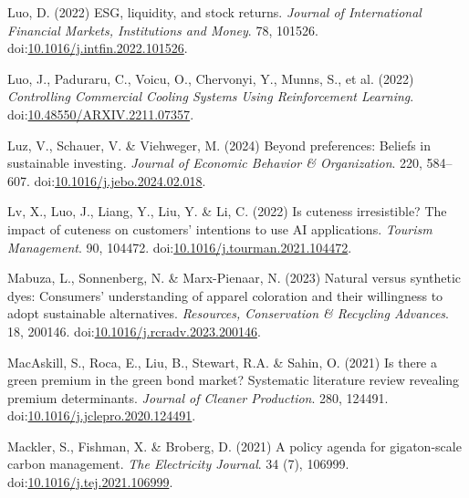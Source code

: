 \documentclass[
  letterpaper,
  DIV=11,
  numbers=noendperiod]{scrartcl}
\newlength{\cslhangindent}
\newenvironment{CSLReferences}[2] %
 {\begin{list}{}{%
  \setlength{\itemindent}{0pt}
  \setlength{\leftmargin}{0pt}
  \setlength{\parsep}{0pt}
  \ifodd #1
   \setlength{\leftmargin}{\cslhangindent}
   \setlength{\itemindent}{-1\cslhangindent}
  \fi
  \setlength{\itemsep}{#2\baselineskip}}}
 {\end{list}}
\begin{document}
\begin{CSLReferences}{0}{1}
Luo, D. (2022) {ESG}, liquidity, and stock returns. \emph{Journal of
International Financial Markets, Institutions and Money}. 78, 101526.
doi:\href{https://doi.org/10.1016/j.intfin.2022.101526}{10.1016/j.intfin.2022.101526}.

Luo, J., Paduraru, C., Voicu, O., Chervonyi, Y., Munns, S., et al.
(2022) \emph{Controlling {Commercial Cooling Systems Using Reinforcement
Learning}}.
doi:\href{https://doi.org/10.48550/ARXIV.2211.07357}{10.48550/ARXIV.2211.07357}.

Luz, V., Schauer, V. \& Viehweger, M. (2024) Beyond preferences:
{Beliefs} in sustainable investing. \emph{Journal of Economic Behavior
\& Organization}. 220, 584--607.
doi:\href{https://doi.org/10.1016/j.jebo.2024.02.018}{10.1016/j.jebo.2024.02.018}.

Lv, X., Luo, J., Liang, Y., Liu, Y. \& Li, C. (2022) Is cuteness
irresistible? {The} impact of cuteness on customers' intentions to use
{AI} applications. \emph{Tourism Management}. 90, 104472.
doi:\href{https://doi.org/10.1016/j.tourman.2021.104472}{10.1016/j.tourman.2021.104472}.

Mabuza, L., Sonnenberg, N. \& Marx-Pienaar, N. (2023) Natural versus
synthetic dyes: {Consumers}' understanding of apparel coloration and
their willingness to adopt sustainable alternatives. \emph{Resources,
Conservation \& Recycling Advances}. 18, 200146.
doi:\href{https://doi.org/10.1016/j.rcradv.2023.200146}{10.1016/j.rcradv.2023.200146}.

MacAskill, S., Roca, E., Liu, B., Stewart, R.A. \& Sahin, O. (2021) Is
there a green premium in the green bond market? {Systematic} literature
review revealing premium determinants. \emph{Journal of Cleaner
Production}. 280, 124491.
doi:\href{https://doi.org/10.1016/j.jclepro.2020.124491}{10.1016/j.jclepro.2020.124491}.

Mackler, S., Fishman, X. \& Broberg, D. (2021) A policy agenda for
gigaton-scale carbon management. \emph{The Electricity Journal}. 34 (7),
106999.
doi:\href{https://doi.org/10.1016/j.tej.2021.106999}{10.1016/j.tej.2021.106999}.


\end{CSLReferences}
\end{document}
